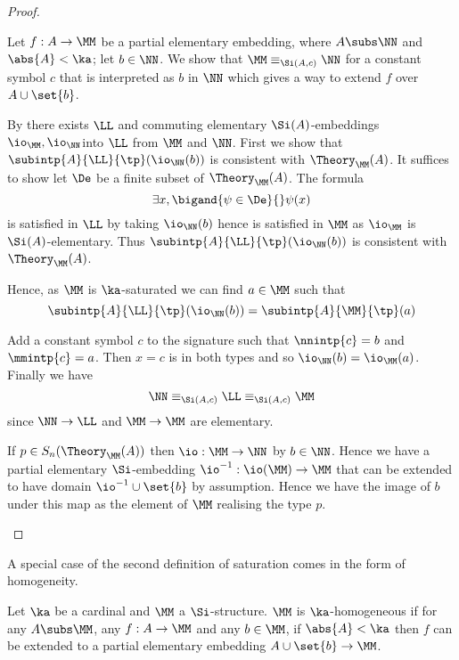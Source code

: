 \begin{proof}
    \begin{forward}
        Let $f : A \to \MM$ be a partial elementary embedding,
        where $A \subs \NN$ and $\abs{A} < \ka$; let $b \in \NN$.
        We show that $\MM \equiv_{\Si(A,c)} \NN$
        for a constant symbol $c$ that is interpreted as $b$ in $\NN$
        which gives a way to extend $f$ over $A \cup \set{b}$.

        By  there exists $\LL$ and 
        commuting elementary $\Si(A)$-embeddings $\io_\MM,\io_\NN$into 
        $\LL$ from $\MM$ and $\NN$.
        First we show that $\subintp{A}{\LL}{\tp}(\io_\NN(b))$ is consistent 
        with $\Theory_\MM(A)$.
        It suffices to show  
        let $\De$ be a finite subset of $\Theory_\MM(A)$. 
        The formula
        \[\exists x, \bigand{\psi \in \De}{} \psi(x)\]
        is satisfied in $\LL$ by taking $\io_\NN(b)$ hence is satisfied in 
        $\MM$ as $\io_\MM$ is $\Si(A)$-elementary.
        Thus $\subintp{A}{\LL}{\tp}(\io_\NN(b))$ is consistent 
        with $\Theory_\MM(A)$.

        Hence, as $\MM$ is $\ka$-saturated we can find $a \in \MM$ such that 
        \[
            \subintp{A}{\LL}{\tp}(\io_\NN(b)) = 
            \subintp{A}{\MM}{\tp}(a)
        \]

        Add a constant symbol $c$ to the signature such that 
        $\nnintp{c} = b$ and $\mmintp{c} = a$.
        Then $x = c$ is in both types and so $\io_\NN(b) = \io_\MM (a)$.
        Finally we have 
        \[\NN \equiv_{\Si(A,c)} \LL \equiv_{\Si(A,c)} \MM\]
        since $\NN \to \LL$ and $\MM \to \MM$ are elementary.
    \end{forward}

    \begin{backward}
        If $p \in S_n(\Theory_\MM(A))$ then  $\io : \MM \to \NN$
        by $b \in \NN$.
        Hence we have a partial elementary $\Si$-embedding 
        $\io^{-1} : \io(\MM) \to \MM$ that can be extended to have domain 
        $\io^{-1} \cup \set{b}$ by assumption.
        Hence we have the image of $b$ under this map as the element of $\MM$ 
        realising the type $p$.
    \end{backward}
\end{proof}

A special case of the second definition of 
saturation comes in the form of homogeneity.
\begin{dfn}[$\ka$-homogeneity]
    Let $\ka$ be a cardinal and $\MM$ a $\Si$-structure.
    $\MM$ is $\ka$-homogeneous 
    if for any $A \subs \MM$, 
    any  
    $f : A \to \MM$ and any $b \in \MM$, 
    if $\abs{A} < \ka$ then 
    $f$ can be extended to a partial elementary embedding 
    $A \cup \set{b} \to \MM$.
\end{dfn}

